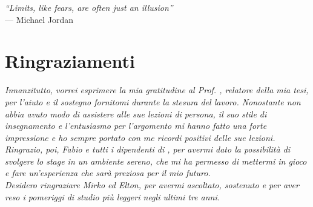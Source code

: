 
\cleardoublepage
{}
{}

\begin{flushright}{
		\slshape
		``Limits, like fears, are often just an illusion''} \\
	\medskip
	--- Michael Jordan
\end{flushright}

\bigskip

\begingroup
\let\clearpage\relax
\let\cleardoublepage\relax
\let\cleardoublepage\relax

\chapter*{Ringraziamenti}


\noindent \textit{Innanzitutto, vorrei esprimere la mia gratitudine al Prof.
	\myProf, relatore della mia tesi, per l'aiuto e il sostegno fornitomi
	durante
	la stesura del lavoro. Nonostante non abbia avuto modo di assistere
	alle sue
	lezioni di persona, il suo stile di insegnamento e l'entusiasmo per
	l'argomento
	mi hanno fatto una forte impressione e ho sempre portato con me ricordi
	positivi delle sue lezioni.}\\


\noindent \textit{Ringrazio, poi, Fabio e tutti i dipendenti di \myCompany, per 	avermi dato la possibilità di svolgere lo stage in un ambiente sereno, che 		mi ha permesso di mettermi in gioco e fare un'esperienza che sarà preziosa 		per il mio futuro.}\\

\noindent \textit{Desidero ringraziare Mirko ed Elton, per avermi ascoltato,
	sostenuto e per aver reso i pomeriggi di studio più leggeri negli ultimi tre
	anni.}\\

